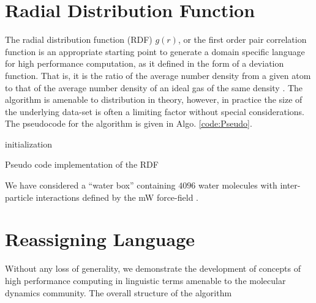 \documentclass[conference]{IEEEtran}
\begin{document}
\section{Radial Distribution Function}
The radial distribution function (RDF) $g(r)$, or the first order pair correlation function is an appropriate starting point to generate a domain specific language for high performance computation, as it defined in the form of a deviation function. That is, it is the ratio of the average number density from a given atom to that of the average number density of an ideal gas of the same density \cite{frenkelUnderstandingMolecularSimulation2001}. The algorithm is amenable to distribution in theory, however, in practice the size of the underlying data-set is often a limiting factor without special considerations. The pseudocode for the algorithm is given in Algo. \ref{code:Pseudo}.
\begin{algorithm}
	initialization\;
	\caption{Pseudo code implementation of the RDF}
	\label{code:Pseudo}
\end{algorithm}
We have considered a ``water box'' containing $4096$ water molecules with inter-particle interactions defined by the mW force-field \cite{molineroWaterModeledIntermediate2009}.

\section{Reassigning Language}
Without any loss of generality, we demonstrate the development of concepts of high performance computing in linguistic terms amenable to the molecular dynamics community. The overall structure of the algorithm
\end{document}
